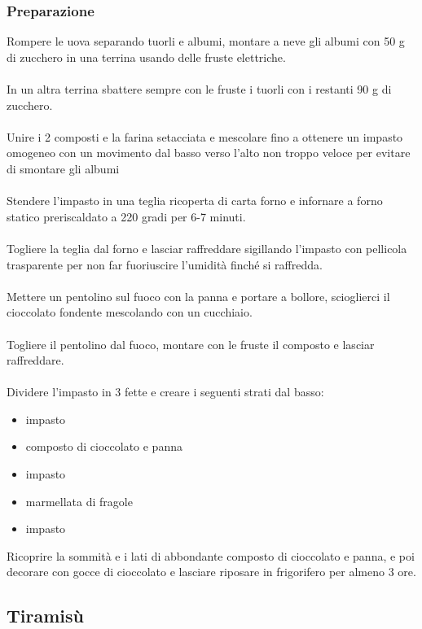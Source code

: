 \documentclass[12pt, a4paper]{article}
\begin{document}
\subsubsection{Preparazione}
	Rompere le uova separando tuorli e albumi, montare a neve gli albumi
	con 50 g di zucchero in una terrina usando delle fruste elettriche.\\\\
	In un altra terrina sbattere sempre con le fruste i tuorli con i restanti
	90 g di zucchero.\\\\
	Unire i 2 composti e la farina setacciata e mescolare fino a ottenere un impasto
	omogeneo con un movimento dal basso verso l'alto non troppo veloce per evitare di
	smontare gli albumi\\\\
	Stendere l'impasto in una teglia ricoperta di carta forno e infornare a forno statico
	preriscaldato a 220 gradi per 6-7 minuti.\\\\
	Togliere la teglia dal forno e lasciar raffreddare sigillando l'impasto con pellicola
	trasparente per non far fuoriuscire l'umidità finché si raffredda.\\\\
	Mettere un pentolino sul fuoco con la panna e portare a bollore, scioglierci il cioccolato
	fondente mescolando con un cucchiaio.\\\\
	Togliere il pentolino dal fuoco, montare con le fruste il composto e lasciar raffreddare.\\\\
	Dividere l'impasto in 3 fette e creare i seguenti strati dal basso:
	\begin{itemize}
	\item	impasto
	\item   composto di cioccolato e panna
	\item   impasto
	\item   marmellata di fragole
	\item   impasto
	\end{itemize}
	Ricoprire la sommità e i lati di abbondante composto di cioccolato e panna, e poi decorare con
	gocce di cioccolato e lasciare riposare in frigorifero per almeno 3 ore.
\clearpage

\subsection{Tiramisù}
\end{document}
